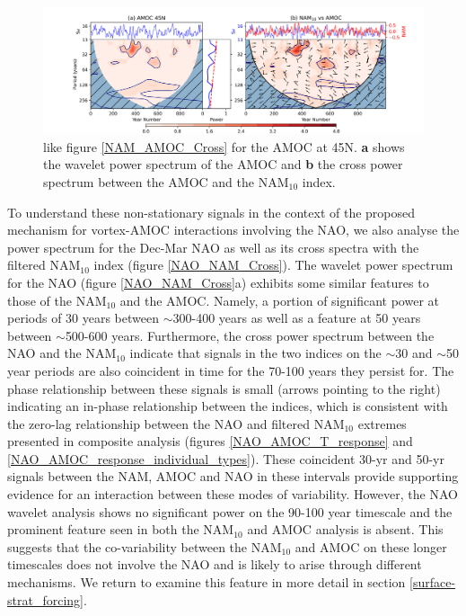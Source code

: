\begin{center}
\begin{figure}[h!]
\noindent\includegraphics[width = \linewidth]{Figures/Figures-surface/AMOC_NAM_filtered_subplot_45N.png}
\caption{like figure \ref{NAM_AMOC_Cross} for the AMOC at 45N. \textbf{a} shows the wavelet power spectrum of the AMOC and \textbf{b} the cross power spectrum between the AMOC and the NAM$_{10}$ index.}
\label{NAM_AMOC_Cross_45}
\end{figure}
\end{center}
  
To understand these non-stationary signals in the context of the proposed mechanism for vortex-AMOC interactions involving the NAO, we also analyse the power spectrum for the Dec-Mar NAO as well as its cross spectra with the filtered NAM$_{10}$ index (figure \ref{NAO_NAM_Cross}). The wavelet power spectrum for the NAO (figure \ref{NAO_NAM_Cross}a) exhibits some similar features to those of the NAM$_{10}$ and the AMOC. Namely, a portion of significant power at periods of 30 years between $\sim$300-400 years as well as a feature at 50 years between $\sim$500-600 years. Furthermore, the cross power spectrum between the NAO and the NAM$_{10}$ indicate that signals in the two indices on the $\sim$30 and $\sim$50 year periods are also coincident in time for the 70-100 years they persist for. The phase relationship between these signals is small (arrows pointing to the right) indicating an in-phase relationship between the indices, which is consistent with the zero-lag relationship between the NAO and filtered NAM$_{10}$ extremes presented in composite analysis (figures \ref{NAO_AMOC_T_response} and \ref{NAO_AMOC_response_individual_types}). These coincident 30-yr and 50-yr signals between the NAM, AMOC and NAO in these intervals provide supporting evidence for an interaction between these modes of variability. However, the NAO wavelet analysis shows no significant power on the 90-100 year timescale and the prominent feature seen in both the NAM$_{10}$ and AMOC analysis is absent. This suggests that the co-variability between the NAM$_{10}$ and AMOC on these longer timescales does not involve the NAO and is likely to arise through different mechanisms. We return to examine this feature in more detail in section \ref{surface-strat_forcing}.

